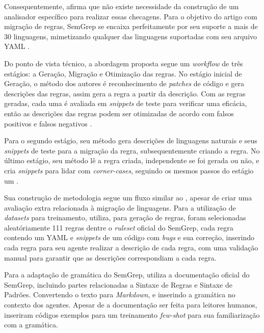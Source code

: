 \documentclass[
    12pt,                %
    openright,           %
    oneside,             %
    a4paper,             %
    english,             %
    brazil               %
]{abntex2}
\begin{document}
\begin{itemize}
\par
Consequentemente,  afirma que não existe necessidade da construção de um analisador específico para realizar essas checagens.
Para o objetivo do artigo com migração de regras, SemGrep se encaixa perfeitamente por seu suporte a mais de 30 linguagens, mimetizando qualquer das linguagens suportadas com seu arquivo YAML \cite{hou2025generation}.
\par
Do ponto de vista técnico, a abordagem proposta segue um \textit{workflow} de três estágios: a Geração, Migração e Otimização das regras.
No estágio inicial de Geração, o método dos autores é reconhecimento de \textit{patches} de código e gera descrições das regras, assim gera a regra a partir da descrição.
Com as regras geradas, cada uma é avaliada em \textit{snippets} de teste para verificar uma eficácia, então as descrições das regras podem ser otimizadas de acordo com falsos positivos e falsos negativos \cite{hou2025generation}.
\par
Para o segundo estágio, seu método gera descrições de linguagens naturais e seus \textit{snippets} de teste para a migração da regra, subsequentemente criando a regra.
No último estágio, seu método lê a regra criada, independente se foi gerada ou não, e cria \textit{snippets} para lidar com \textit{corner-cases}, seguindo os mesmos passos do estágio um \cite{hou2025generation}.
\par
Sua construção de metodologia segue um fluxo similar ao , apesar de criar uma avaliação extra relacionada à migração de linguagens.
Para a utilização de \textit{datasets} para treinamento,  utiliza, para geração de regras, foram selecionadas aleatóriamente 111 regras dentre o \textit{ruleset} oficial do SemGrep, cada regra contendo um YAML e \textit{snippets} de um código com \textit{bugs} e sua correção, inserindo cada regra para seu agente realizar a descrição de cada regra, com uma validação manual para garantir que as descrições correspondiam a cada regra.
\par
Para a adaptação de gramática do SemGrep,  utiliza a documentação oficial do SemGrep, incluindo partes relacionadas a Sintaxe de Regras e Sintaxe de Padrões. Convertendo o texto para \textit{Markdown}, e inserindo a gramática no contexto dos agentes.
Apesar de a documentação ser feita para leitores humanos,  inseriram códigos exemplos para um treinamento \textit{few-shot} para sua familiarização com a gramática.

\end{itemize}
\end{document}

